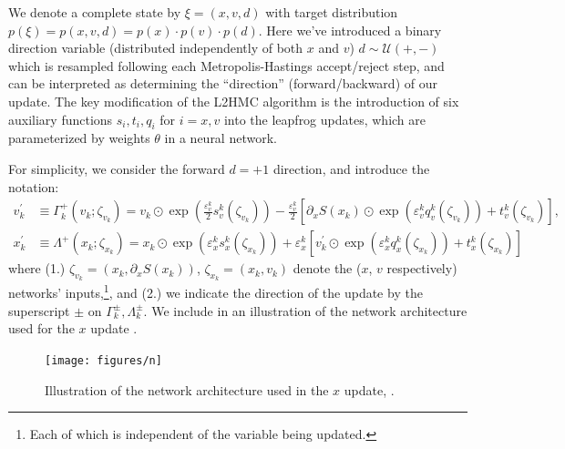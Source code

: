 \documentclass{article} %
\begin{document}
We denote a complete state by \(\xi = (x, v, d)\) with target distribution \(p(\xi) = p(x, v, d) = p(x)\cdot p(v)\cdot
p(d)\).
%
Here we've introduced a binary direction variable (distributed independently of both \(x\) and \(v\))
\(d\sim\mathcal{U}(+,-)\) which is resampled following each Metropolis-Hastings accept/reject step, and can be
interpreted as determining the ``direction'' (forward/backward) of our update.
%
The key modification of the L2HMC algorithm is the introduction of six auxiliary functions \(s_{i}, t_{i}, q_{i}\) for \(i
= x, v\) into the leapfrog updates, which are parameterized by weights \(\theta\) in a neural network.
%

For simplicity, we consider the forward \(d=+1\) direction, and introduce the notation:
%
\begin{align}
   v^{\prime}_{k} &\equiv \Gamma^{+}_{k}(v_{k};\zeta_{v_{k}})
   = v_{k}\odot \exp{\left(\tfrac{\varepsilon^{k}_{v}}{2}s_{v}^{k}(\zeta_{v_{k}})\right)} -
   \tfrac{\varepsilon^{k}_{v}}{2}{\left[\partial_{x}S(x_{k})\odot\exp{\left(\varepsilon^{k}_{v} q_{v}^{k}(\zeta_{v_{k}})\right)}
      +t_{v}^{k}(\zeta_{v_{k}})\right]},\label{eq:new_momentum_update}\\
   x^{\prime}_{k} &\equiv \Lambda^{+}(x_{k};\zeta_{x_{k}})
   = x_{k}\odot\exp(\varepsilon^{k}_{x} s^{k}_{x}(\zeta_{x_{k}}))
   + \varepsilon^{k}_{x}\left[v^{\prime}_{k}\odot\exp(\varepsilon^{k}_{x} q^{k}_{x}(\zeta_{x_{k}}))
         + t^{k}_{x}(\zeta_{x_{k}})\right]\label{eq:new_position_update}
\end{align}
%
where (1.) \(\zeta_{v_{k}} = (x_{k}, \partial_{x}S(x_{k}))\), \(\zeta_{x_{k}} = (x_{k}, v_{k})\) denote the (\(x\),
\(v\) respectively) networks' inputs,\footnote{%
   Each of which is independent of the variable being updated.
}, and (2.) we indicate the direction of the update by the superscript \(\pm\) on \(\Gamma^{\pm}_{k},
\Lambda^{\pm}_{k}\).
%
We include in  an illustration of the network architecture used for the \(x\) update .
%
\begin{figure}[htpb]
   \centering
   \texttt{[image: figures/n]}
   \caption{\label{fig:network}Illustration of the network architecture used in the \(x\) update, .}
\end{figure}
\end{document}
